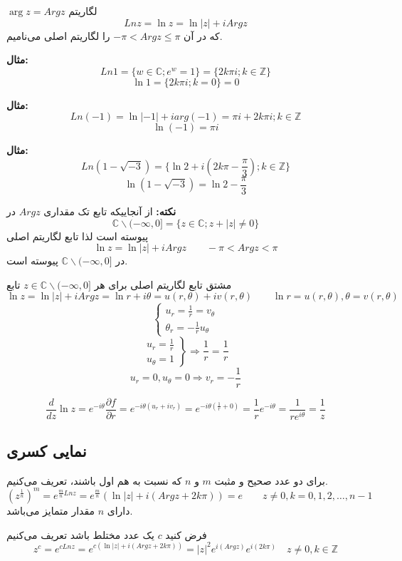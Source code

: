 \documentclass[12pt]{report}
\begin{document}
	 $\arg z = Arg z$
	 لگاریتم
	 $$Ln z = \ln z = \ln |z| + i Arg z$$
	 که در آن 
	 $-\pi < Arg z \leq \pi$
	را لگاریتم اصلی می‌نامیم.
	
	\textbf{مثال:}
	$$Ln 1 = \{w \in \mathbb{C} ; e^w = 1\} = \{2k\pi i;k \in \mathbb{Z}\}$$
	$$\ln 1 = \{2k\pi i; k = 0\} = 0$$
	
	\textbf{مثال:}
	$$Ln(-1) = \ln |-1| + i arg(-1) = \pi i + 2k\pi i ; k \in \mathbb{Z}$$
	$$\ln (-1) = \pi i $$
	
	\textbf{مثال:}
	$$Ln(1-\sqrt{-3}) = \{\ln 2 + i (2k\pi - \frac{\pi}{3}); k \in \mathbb{Z}\}$$
	$$\ln(1-\sqrt{-3}) = \ln 2 - \frac{\pi}{3}$$
	
	\textbf{نکته:}
	از آنجاییکه تابع تک مقداری 
	$Arg z$
	در
	$$\mathbb{C} \backslash (-\infty, 0] = \{z \in \mathbb{C}; z + |z| \neq 0\} $$
	پیوسته است لذا تابع لگاریتم اصلی 
	$$\ln z = \ln |z| + iArg z \qquad -\pi < Arg z < \pi$$
	در  
	$\mathbb{C} \backslash (-\infty, 0]$
	پیوسته است.
	
	مشتق تابع لگاریتم اصلی برای هر 
	$z \in \mathbb{C} \backslash (-\infty, 0 ]$
	تابع 
	$$\ln z = \ln |z| + i Arg z = \ln r + i \theta = u(r, \theta) + iv(r, \theta) \qquad \ln r  = u(r, \theta) , \theta =  v(r, \theta)$$
	\[
	\begin{cases}
		u_r = \frac{1}{r} = v_\theta\\
		\theta_r = -\frac{1}{r} u_\theta
	\end{cases}
	\]
	\[
	\left.
	\begin{array}{l}
		u_r = \frac{1}{r} \\
		u_\theta = 1
	\end{array}
	\right\} \Rightarrow \frac{1}{r} = \frac{1}{r}
	\]
	$$u_r = 0 , u_\theta = 0 \Rightarrow v_r = -\frac{1}{r}$$
	
	\[
	\frac{d}{dz} \ln z = e^{-i\theta} \frac{\partial f}{\partial r} = e^{-i\theta(u_r + iv_r)} = e^{-i\theta(\frac{1}{r} + 0)} = \frac{1}{r} e^{-i\theta} = \frac{1}{re^{i\theta}} = \frac{1}{z}
	\]
	
	\subsection{نمایی کسری}
	برای دو عدد صحیح و مثبت
	$m$
	و
	$n$
	که نسبت به هم اول باشند، تعریف می‌کنیم.
	$$(z^{\frac{1}{n}})^m = e^{\frac{m}{n} Ln z} = e^{\frac{m}{n}}(\ln |z| + i(Arg z + 2k \pi )) = e \qquad z \neq 0 , k = 0, 1, 2, \dots, n-1$$
	دارای 
	$n$
	مقدار متمایز می‌باشد.
	
	فرض کنید
	$c$
	یک عدد مختلط باشد تعریف می‌کنیم
	$$z^c = e^{c Lnz} = e^{c(\ln |z| + i (Arg z + 2k\pi))} = |z|^2 e^{i(Argz)} e^{i(2k\pi)} \quad z\neq 0 , k \in \mathbb{Z} $$
	
\end{document}
